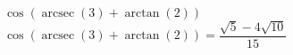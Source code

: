  {$\cos\left( \operatorname{arcsec}(3) + \arctan(2) \right)$ }
{ $\cos\left( \operatorname{arcsec}(3) + \arctan(2) \right) = \dfrac{\sqrt{5} - 4\sqrt{10}}{15}$ }
